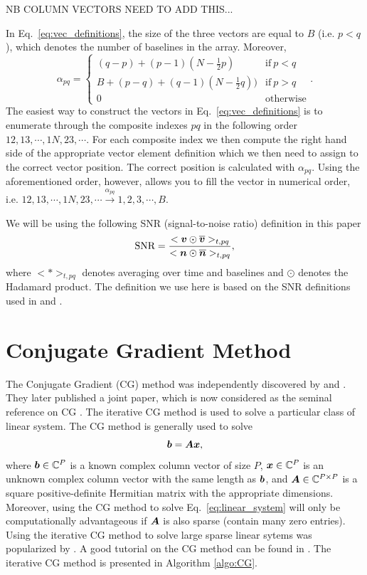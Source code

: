 \documentclass[useAMS,usenatbib]{mn2e}
\newcommand{\bA}{\bmath{A}}
\newcommand{\bv}{\bmath{v}}
\newcommand{\bn}{\bmath{n}}
\newcommand{\bb}{\bmath{b}}
\newcommand{\bx}{\bmath{x}}
\newcommand{\conj}[1]{\overline{#1}}
\begin{document}
NB COLUMN VECTORS NEED TO ADD THIS...

In Eq.~\eqref{eq:vec_definitions}, the size of the three vectors are equal to $B$ (i.e. $p<q$), which denotes the number of baselines in the array. Moreover,
\begin{equation}
\alpha_{pq} =
\begin{cases}
(q-p) + (p-1)\left (N-\frac{1}{2}p \right ) & \textrm{if}~p<q\\
B + (p-q) + (q-1)\left (N-\frac{1}{2}q \right )) & \textrm{if}~p>q\\
0 & \textrm{otherwise}
\end{cases}.
\end{equation}
The easiest way to construct the vectors in Eq.~\ref{eq:vec_definitions} is to enumerate through the composite indexes $pq$ in the following order $12, 13,\cdots,1N,23,\cdots$.
For each composite index we then compute the right hand side of the appropriate vector element definition which we then need to assign to the 
correct vector position. The correct position is calculated with $\alpha_{pq}$. Using the aforementioned order, however, allows you to fill the vector in numerical order, i.e. $12,13,\cdots,1N,23,\cdots \xrightarrow{\alpha_{pq}} 1,2,3,\cdots,B$.  


We will be using the following SNR (signal-to-noise ratio) definition in this paper  
\begin{equation}
\textrm{SNR} = \frac{<\bv\odot\conj{\bv}>_{t,pq}}{<\bn\odot\conj{\bn}>_{t,pq}}, 
\end{equation}
where $<*>_{t,pq}$ denotes averaging over time and baselines and $\odot$ denotes the Hadamard product. The definition we use here is based on the SNR definitions used in \citet{Liu2010} and \citet{Marthi2014}.

\section{Conjugate Gradient Method}
The Conjugate Gradient (CG) method was independently discovered by \citet{Hestenes1973} and \citet{Stiefel1952}. They later published a joint paper, which is now considered as the seminal
reference on CG \citep{Hestenes1952}. The iterative CG method is used to solve a particular class of linear system. The CG method is generally used to solve
\begin{equation}
\label{eq:linear_system}
\bb = \bA\bx,
\end{equation}
where $\bb\in\mathbb{C}^P$ is a known complex column vector of size $P$, $\bx\in\mathbb{C}^P$ is an unknown complex column vector with the same length as $\bb$, and $\bA\in\mathbb{C}^{P\times P}$ is a square positive-definite Hermitian matrix with the appropriate dimensions.  
Moreover, using the CG method to solve Eq.~\eqref{eq:linear_system} will only be computationally advantageous if $\bA$ is also sparse (contain many zero entries).
Using the iterative CG method to solve large sparse linear sytems was popularized by \citet{Reid1971}. A good tutorial on the CG method can be found in \citep{Shewchuk1994}.
The iterative CG method is presented in Algorithm \ref{algo:CG}. 
\end{document}
